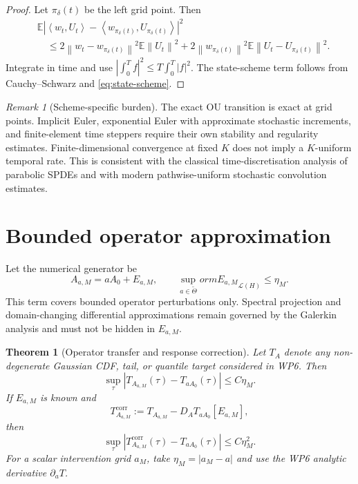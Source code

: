 \documentclass[11pt]{article}
\newtheorem{theorem}[assumption]{Theorem}
\theoremstyle{remark}
\newtheorem{remark}[assumption]{Remark}
\newcommand{\E}{\mathbb E}
\newcommand{\cL}{\mathcal L}
\newcommand{\norm}[1]{\left\lVert #1\right\rVert}
\newcommand{\ip}[2]{\left\langle #1,#2\right\rangle}
\begin{document}
\begin{proof}
Let $\pi_\delta(t)$ be the left grid point. Then
\begin{align*}
 &\E\left|
 \ip{w_t}{U_t}-\ip{w_{\pi_\delta(t)}}{U_{\pi_\delta(t)}}
 \right|^2\\
 &\quad\le
 2\norm{w_t-w_{\pi_\delta(t)}}^2\E\norm{U_t}^2
 +2\norm{w_{\pi_\delta(t)}}^2
 \E\norm{U_t-U_{\pi_\delta(t)}}^2.
\end{align*}
Integrate in time and use $|\int_0^T f|^2\le T\int_0^T|f|^2$. The state-scheme term follows from Cauchy--Schwarz and \eqref{eq:state-scheme}.
\end{proof}

\begin{remark}[Scheme-specific burden]
The exact OU transition is exact at grid points. Implicit Euler, exponential Euler with approximate stochastic increments, and finite-element time steppers require their own stability and regularity estimates. Finite-dimensional convergence at fixed $K$ does not imply a $K$-uniform temporal rate. This is consistent with the classical time-discretisation analysis of parabolic SPDEs and with modern pathwise-uniform stochastic convolution estimates.
\end{remark}

\section{Bounded operator approximation}

Let the numerical generator be
\begin{equation}\label{eq:operator-approx}
 A_{a,M}=aA_0+E_{a,M},
 \qquad
 \sup_{a\in\widetilde\Theta}
orm{E_{a,M}}_{\cL(H)}\le\eta_M.
\end{equation}
This term covers bounded operator perturbations only. Spectral projection and domain-changing differential approximations remain governed by the Galerkin analysis and must not be hidden in $E_{a,M}$.

\begin{theorem}[Operator transfer and response correction]\label{thm:operator}
Let $T_A$ denote any non-degenerate Gaussian CDF, tail, or quantile target considered in WP6. Then
\begin{equation}\label{eq:op-first}
 \sup_\tau|T_{A_{a,M}}(\tau)-T_{aA_0}(\tau)|
 \le C\eta_M.
\end{equation}
If $E_{a,M}$ is known and
\begin{equation}\label{eq:op-corrected}
 T_{A_{a,M}}^{\mathrm{corr}}
 :=T_{A_{a,M}}-D_AT_{aA_0}[E_{a,M}],
\end{equation}
then
\begin{equation}\label{eq:op-second}
 \sup_\tau|T_{A_{a,M}}^{\mathrm{corr}}(\tau)-T_{aA_0}(\tau)|
 \le C\eta_M^2.
\end{equation}
For a scalar intervention grid $a_M$, take $\eta_M=|a_M-a|$ and use the WP6 analytic derivative $\partial_aT$.
\end{theorem}
\end{document}
